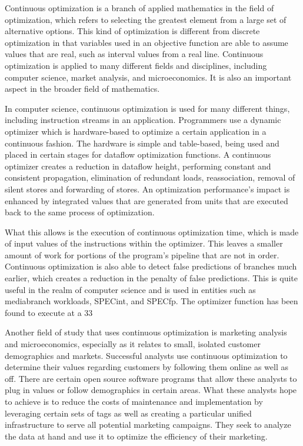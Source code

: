Continuous optimization is a branch of applied mathematics in the field of optimization, which refers to selecting the greatest element from a large set of alternative options. This kind of optimization is different from discrete optimization in that variables used in an objective function are able to assume values that are real, such as interval values from a real line. Continuous optimization is applied to many different fields and disciplines, including computer science, market analysis, and microeconomics. It is also an important aspect in the broader field of mathematics.

In computer science, continuous optimization is used for many different things, including instruction streams in an application. Programmers use a dynamic optimizer which is hardware-based to optimize a certain application in a continuous fashion. The hardware is simple and table-based, being used and placed in certain stages for dataflow optimization functions. A continuous optimizer creates a reduction in dataflow height, performing constant and consistent propagation, elimination of redundant loads, reassociation, removal of silent stores and forwarding of stores. An optimization performance’s impact is enhanced by integrated values that are generated from units that are executed back to the same process of optimization.

What this allows is the execution of continuous optimization time, which is made of input values of the instructions within the optimizer. This leaves a smaller amount of work for portions of the program’s pipeline that are not in order. Continuous optimization is also able to detect false predictions of branches much earlier, which creates a reduction in the penalty of false predictions. This is quite useful in the realm of computer science and is used in entities such as mediabranch workloads, SPECint, and SPECfp. The optimizer function has been found to execute at a 33%

Another field of study that uses continuous optimization is marketing analysis and microeconomics, especially as it relates to small, isolated customer demographics and markets. Successful analysts use continuous optimization to determine their values regarding customers by following them online as well as off. There are certain open source software programs that allow these analysts to plug in values or follow demographics in certain areas. What these analysts hope to achieve is to reduce the costs of maintenance and implementation by leveraging certain sets of tags as well as creating a particular unified infrastructure to serve all potential marketing campaigns. They seek to analyze the data at hand and use it to optimize the efficiency of their marketing.
